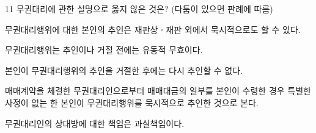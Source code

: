 \begin{question}{11}
무권대리에 관한 설명으로 옳지 않은 것은? (다툼이 있으면 판례에 따름)
\begin{choices}
  \item 무권대리행위에 대한 본인의 추인은 재판상ㆍ재판 외에서 묵시적으로도 할 수 있다.
  \item 무권대리행위는 추인이나 거절 전에는 유동적 무효이다.
  \item 본인이 무권대리행위의 추인을 거절한 후에는 다시 추인할 수 없다.
  \item 매매계약을 체결한 무권대리인으로부터 매매대금의 일부를 본인이 수령한 경우 특별한 사정이 없는 한 본인이 무권대리행위를 묵시적으로 추인한 것으로 본다.
  \item 무권대리인의 상대방에 대한 책임은 과실책임이다.
\end{choices}
\end{question}

